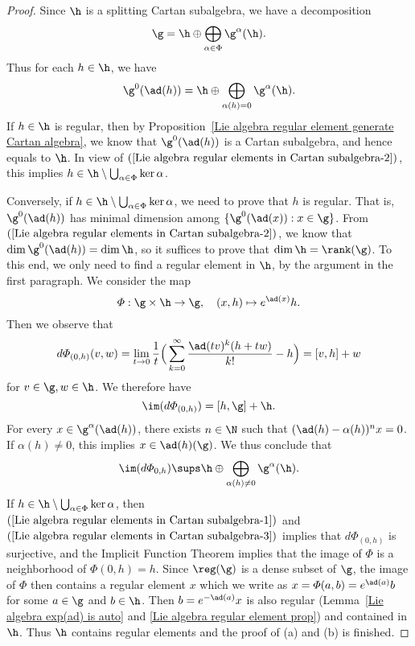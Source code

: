 \begin{proof}
Since $\h$ is a splitting Cartan subalgebra, we have a decomposition
\begin{align}\label{Lie algebra regular elements in Cartan subalgebra-1}
\g=\h\oplus\bigoplus_{\alpha\in\Phi}\g^\alpha(\h).
\end{align}
Thus for each $h\in\h$, we have
\begin{align}\label{Lie algebra regular elements in Cartan subalgebra-2}
\g^0(\ad(h))=\h\oplus\bigoplus_{\alpha(h)=0}\g^{\alpha}(\h).
\end{align}
If $h\in\h$ is regular, then by Proposition~\ref{Lie algebra regular element generate Cartan algebra}, we know that $\g^0(\ad(h))$ is a Cartan subalgebra, and hence equals to $\h$. In view of $(\ref{Lie algebra regular elements in Cartan subalgebra-2})$, this implies $h\in\h\setminus\bigcup_{\alpha\in\Phi}\ker\alpha$.\par
Conversely, if $h\in\h\setminus\bigcup_{\alpha\in\Phi}\ker\alpha$, we need to prove that $h$ is regular. That is, $\g^0(\ad(h))$ has minimal dimension among $\{\g^0(\ad(x)):x\in\g\}$. From $(\ref{Lie algebra regular elements in Cartan subalgebra-2})$, we know that $\dim\g^0(\ad(h))=\dim\h$, so it suffices to prove that $\dim\h=\rank(\g)$. To this end, we only need to find a regular element in $\h$, by the argument in the first paragraph. We consider the map
\[\varPhi:\g\times\h\to\g,\quad (x,h)\mapsto e^{\ad(x)}h.\]
Then we observe that
\[d\varPhi_{(0,h)}(v,w)=\lim_{t\to 0}\frac{1}{t}\Big(\sum_{k=0}^{\infty}\frac{\ad(tv)^k(h+tw)}{k!}-h\Big)=[v,h]+w\]
for $v\in\g,w\in\h$. We therefore have
\[\im(d\varPhi_{(0,h)})=[h,\g]+\h.\]
For every $x\in\g^\alpha(\ad(h))$, there exists $n\in\N$ such that $(\ad(h)-\alpha(h))^nx=0$. If $\alpha(h)\neq 0$, this implies $x\in\ad(h)(\g)$. We thus conclude that
\begin{align}\label{Lie algebra regular elements in Cartan subalgebra-3}
\im(d\varPhi_{0,h})\sups\h\oplus\bigoplus_{\alpha(h)\neq 0}\g^\alpha(\h).
\end{align}
If $h\in\h\setminus\bigcup_{\alpha\in\Phi}\ker\alpha$, then $(\ref{Lie algebra regular elements in Cartan subalgebra-1})$ and $(\ref{Lie algebra regular elements in Cartan subalgebra-3})$ implies that $d\varPhi_{(0,h)}$ is surjective, and the Implicit Function Theorem implies that the image of $\varPhi$ is a neighborhood of $\varPhi(0,h)=h$. Since $\reg(\g)$ is a dense subset of $\g$, the image of $\varPhi$ then contains a regular element $x$ which we write as $x=\varPhi(a,b)=e^{\ad(a)}b$ for some $a\in\g$ and $b\in\h$. Then $b=e^{-\ad(a)}x$ is also regular (Lemma~\ref{Lie algebra exp(ad) is auto} and \ref{Lie algebra regular element prop}) and contained in $\h$. Thus $\h$ contains regular elements and the proof of (a) and (b) is finished.
\end{proof}
